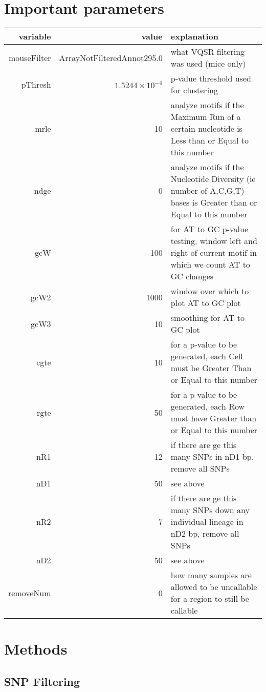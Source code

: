 \documentclass{article}\usepackage[]{graphicx}\usepackage[]{color}
\begin{document}
\section*{Important parameters}

\begin{tabular}{ r | r | p{12cm} }
variable & value & explanation \\\hline
mouseFilter & ArrayNotFilteredAnnot295.0 & what VQSR filtering was used (mice only) \\
pThresh & \ensuremath{1.5244\times 10^{-4}} & p-value threshold used for clustering \\
mrle & 10 & analyze motifs if the Maximum Run of a certain nucleotide is Less than or Equal to this number \\
ndge & 0 & analyze motifs if the Nucleotide Diversity (ie number of A,C,G,T) bases is Greater than or Equal to this number \\
gcW & 100 & for AT to GC p-value testing, window left and right of current motif in which we count AT to GC changes \\
gcW2 & 1000 & window over which to plot AT to GC plot\\
gcW3 & 10 & smoothing for AT to GC plot\\
cgte & 10 & for a p-value to be generated, each Cell must be Greater Than or Equal to this number \\
rgte & 50 & for a p-value to be generated, each Row must have Greater than or Equal to this number \\
nR1 & 12 & if there are ge this many SNPs in nD1 bp, remove all SNPs \\
nD1 & 50 & see above \\
nR2 & 7 & if there are ge this many SNPs down any individual lineage in nD2 bp, remove all SNPs \\
nD2 & 50 & see above \\
removeNum & 0 & how many samples are allowed to be uncallable for a region to still be callable \\
\end{tabular}





\section*{Methods}

\subsection*{SNP Filtering}
\end{document}
